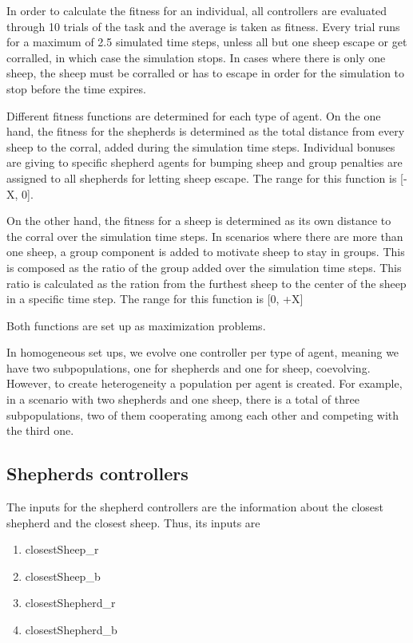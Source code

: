 \documentclass[conference]{IEEEtran}
\begin{document}
In order to calculate the fitness for an individual, all controllers are evaluated through 10 trials of the task and the average is taken as fitness. Every trial runs for a maximum of 2.5 simulated time steps, unless all but one sheep escape or get corralled, in which case the simulation stops. In cases where there is only one sheep, the sheep must be corralled or has to escape in order for the simulation to stop before the time expires.

Different fitness functions are determined for each type of agent. On the one hand, the fitness for the shepherds is determined as the total distance from every sheep to the corral, added during the simulation time steps. Individual bonuses are giving to specific shepherd agents for bumping sheep and group penalties are assigned to all shepherds for letting sheep escape. The range for this function is [-X, 0]. 

On the other hand, the fitness for a sheep is determined as its own distance to the corral over the simulation time steps. In scenarios where there are more than one sheep, a group component is added to motivate sheep to stay in groups. This is composed as the ratio of the group added over the simulation time steps. This ratio is calculated as the ration from the furthest sheep to the center of the sheep in a specific time step. The range for this function is [0, +X]

Both functions are set up as maximization problems. 

In homogeneous set ups, we evolve one controller per type of agent, meaning we have two subpopulations, one for shepherds and one for sheep, coevolving. However, to create heterogeneity a population per agent is created. For example, in a scenario with two shepherds and one sheep, there is a total of three subpopulations, two of them cooperating among each other and competing with the third one.  



\subsection{Shepherds controllers}
The inputs for the shepherd controllers are the information about the closest shepherd and the closest sheep. Thus, its inputs are 

\begin{enumerate}
	\item closestSheep\_r
	\item closestSheep\_b
	\item closestShepherd\_r
	\item closestShepherd\_b 
\end{enumerate}
\end{document}
